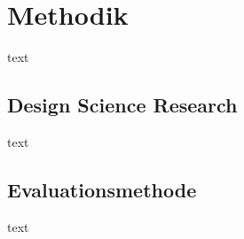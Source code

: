 \section{Methodik}
text
\subsection{Design Science Research}
text
\subsection{Evaluationsmethode}
text